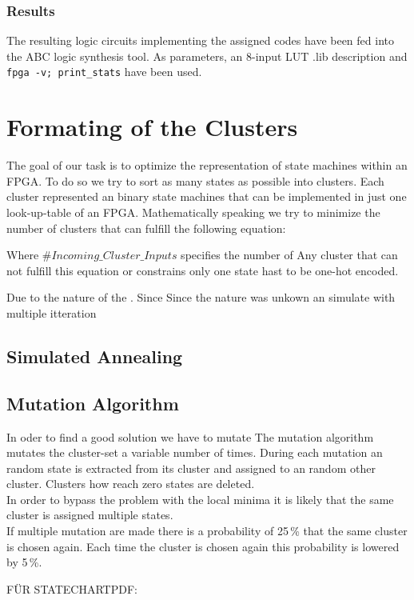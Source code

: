 \subsubsection{Results}
\label{subsubsec:Results}

The resulting logic circuits implementing the assigned codes have been fed into the ABC logic synthesis tool. As parameters, an 8-input LUT .lib description and \texttt{fpga -v; print\_stats} have been used.




\section{Formating of the Clusters}
\label{subsubsec:format_clusters}

The goal of our task is to optimize the representation of state machines within an FPGA.
To do so we try to sort as many states as possible into clusters. Each cluster represented an binary state machines that can be implemented in just one look-up-table of an FPGA. 
Mathematically speaking we try to minimize the number of clusters that can fulfill the following equation:


Where $ \#Incoming\_Cluster\_Inputs $ specifies the number of 
Any cluster that can not fulfill this equation or constrains only one state hast to be one-hot encoded. 



Due to the nature of the . Since 
Since the nature was unkown an simulate with multiple itteration

\subsection{Simulated Annealing}
\label{subsubsec:format_clusters}


\subsection{Mutation Algorithm}
\label{subsubsec:format_clusters}

In oder to find a good solution we have to mutate
The mutation algorithm mutates the cluster-set a variable number of times.
During each mutation an random state is extracted from its cluster and assigned to an random other cluster. Clusters how reach zero states are deleted. \\
In order to bypass the problem with the local minima it is likely that the same cluster is assigned multiple states.\\
If multiple mutation are made there is a probability of 25\,\% that the same cluster is chosen again. Each time the cluster is chosen again this probability is lowered by 5\,\%.




FÜR STATECHARTPDF:



